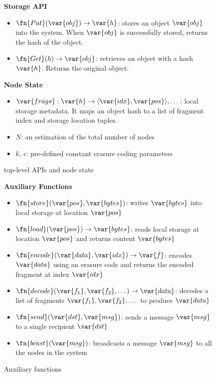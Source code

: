\begin{figure}
\begin{mdframed}
\textbf{Storage API}
\begin{itemize}
    \item $\fn{Put}(\var{obj}) \rightarrow \var{h}$:
    stores an object $\var{obj}$ into the system.
    When $\var{obj}$ is successfully stored, returns the hash of the object.
    \item $\fn{Get}(h) \rightarrow \var{obj}$:
    retrieves an object with a hash $\var{h}$.
    Returns the original object.
\end{itemize}


\textbf{Node State}
\begin{itemize}
    \item $\var{frags}: \var{h} \rightarrow \langle \var{idx}, \var{pos} \rangle, \dots$:
    local storage metadata. It maps an object hash to a list of fragment index and storage location tuples.
    \item $N$:
    an estimation of the total number of nodes
    \item $k$, $\epsilon$:
    pre-defined constant erasure coding parameters
\end{itemize}

\end{mdframed}
\caption{\sys top-level APIs and node state}
\label{fig:node-state}
\end{figure}
\begin{figure}
\begin{mdframed}


\textbf{Auxiliary Functions}
\begin{itemize}
    \item $\fn{store}(\var{pos}, \var{bytes})$:
    writes $\var{bytes}$ into local storage at location $\var{pos}$
    \item $\fn{load}(\var{pos}) \rightarrow \var{bytes}$:
    reads local storage at location $\var{pos}$ and returns content $\var{bytes}$
    \item $\fn{encode}(\var{data}, \var{idx}) \rightarrow \var{f}$:
    encodes $\var{data}$ using an erasure code and returns the encoded fragment at index $\var{idx}$
    \item $\fn{decode}(\var{f_1}, \var{f_2}, \dots) \rightarrow \var{data}$:
    decodes a list of fragments $\var{f_1}, \var{f_2}, \dots$ to produce $\var{data}$
    \item $\fn{send}(\var{dst}, \var{msg})$:
    sends a message $\var{msg}$ to a single recipient $\var{dst}$
    \item $\fn{bcast}(\var{msg})$:
    broadcasts a message $\var{msg}$ to all the nodes in the system
\end{itemize}
\end{mdframed}
\caption{\sys Auxiliary functions}
\label{fig:node-aux}
\end{figure}


